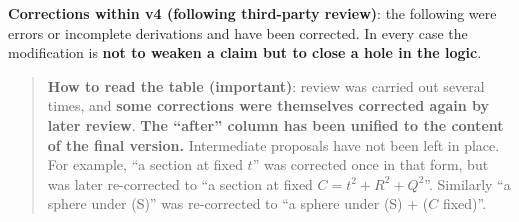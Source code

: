\documentclass[
  10pt,
]{article}
\begin{document}
\textbf{Corrections within v4 (following third-party review)}: the
following were errors or incomplete derivations and have been corrected.
In every case the modification is \textbf{not to weaken a claim but to
close a hole in the logic}.

\begin{quote}
\textbf{How to read the table (important)}: review was carried out
several times, and \textbf{some corrections were themselves corrected
again by later review}. \textbf{The ``after'' column has been unified to
the content of the final version.} Intermediate proposals have not been
left in place. For example, ``a section at fixed \(t\)'' was corrected
once in that form, but was later re-corrected to ``a section at fixed
\(C=t^2+R^2+Q^2\)''. Similarly ``a sphere under (S)'' was re-corrected
to ``a sphere under (S) + (\(C\) fixed)''.
\end{quote}
\end{document}

